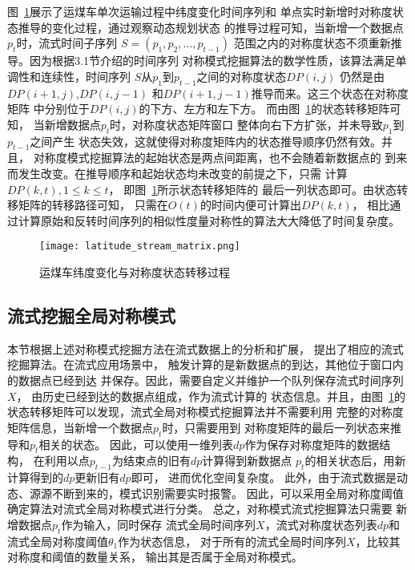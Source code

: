 图~\ref{fig:latitude_stream_matrix}展示了运煤车单次运输过程中纬度变化时间序列和
单点实时新增时对称度状态推导的变化过程，通过观察动态规划状态
的推导过程可知，当新增一个数据点$p_t$时，流式时间子序列
$S=\left(p_{1},p_{2},…,p_{t-1} \right)$
范围之内的对称度状态不须重新推导。因为根据3.1节介绍的时间序列
对称模式挖掘算法的数学性质，该算法满足单调性和连续性，时间序列
$S$从$p_{1}$到$p_{t-1}$之间的对称度状态$DP\left(i,j\right)$
仍然是由$DP\left(i+1,j\right)$,$DP\left(i,j-1\right)$
和$DP\left(i+1,j-1\right)$推导而来。这三个状态在对称度矩阵
中分别位于$DP\left(i,j\right)$的下方、左方和左下方。
而由图~\ref{fig:latitude_stream_matrix}的状态转移矩阵可知，
当新增数据点$p_t$时，对称度状态矩阵窗口
整体向右下方扩张，并未导致$p_{1}$到$p_{t-1}$之间产生
状态失效，这就使得对称度矩阵内的状态推导顺序仍然有效。并且，
对称度模式挖掘算法的起始状态是两点间距离，也不会随着新数据点的
到来而发生改变。在推导顺序和起始状态均未改变的前提之下，只需
计算$DP\left(k,t\right),1\leq k \leq t$，
即图~\ref{fig:latitude_stream_matrix}所示状态转移矩阵的
最后一列状态即可。由状态转移矩阵的转移路径可知，
只需在$O\left(t\right)$的时间内便可计算出$DP\left(k,t\right)$，
相比通过计算原始和反转时间序列的相似性度量对称性的算法大大降低了时间复杂度。
\begin{figure}
  \centering
  \texttt{[image: latitude\_stream\_matrix.png]}
  \caption{运煤车纬度变化与对称度状态转移过程}
  \label{fig:latitude_stream_matrix}
\end{figure}

\subsection{流式挖掘全局对称模式}
本节根据上述对称模式挖掘方法在流式数据上的分析和扩展，
提出了相应的流式挖掘算法。在流式应用场景中，
触发计算的是新数据点的到达，其他位于窗口内的数据点已经到达
并保存。因此，需要自定义并维护一个队列保存流式时间序列$X$，
由历史已经到达的数据点组成，作为流式计算的
状态信息。并且，由图~\ref{fig:latitude_stream_matrix}的
状态转移矩阵可以发现，流式全局对称模式挖掘算法并不需要利用
完整的对称度矩阵信息，当新增一个数据点$p_t$时，只需要用到
对称度矩阵的最后一列状态来推导和$p_t$相关的状态。
因此，可以使用一维列表$dp$作为保存对称度矩阵的数据结构，
在利用以点$p_{t-1}$为结束点的旧有$dp$计算得到新数据点
$p_t$的相关状态后，用新计算得到的$dp$更新旧有$dp$即可，
进而优化空间复杂度。
此外，由于流式数据是动态、源源不断到来的，模式识别需要实时报警。
因此，可以采用全局对称度阈值确定算法对流式全局对称模式进行分类。
总之，对称模式流式挖掘算法只需要
新增数据点$p_t$作为输入，同时保存
流式全局时间序列$X$，流式对称度状态列表$dp$和
流式全局对称度阈值$\theta_1$作为状态信息，
对于所有的流式全局时间序列$X$，比较其对称度和阈值的数量关系，
输出其是否属于全局对称模式。

